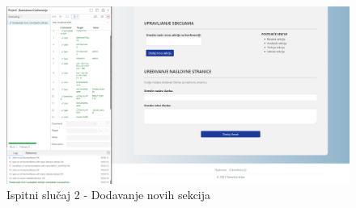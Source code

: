 			   \begin{figure}[H]
			 	\includegraphics[width= 15 cm, height= 25 cm, keepaspectratio]{slike/test_dodavanje_sekcija.png} 
			 	\centering
			 	\caption{Ispitni slučaj 2 - Dodavanje novih sekcija}
			 	\label{fig:act5}
			 \end{figure}
			

